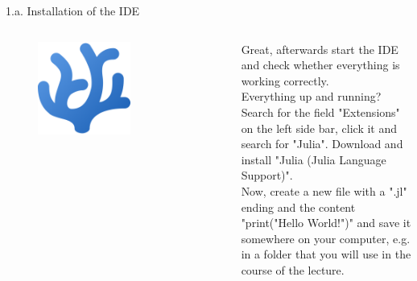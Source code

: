 \documentclass[aspectratio=1610,12pt]{beamer}
\begin{document}
\begin{frame}[fragile]{1.a. Installation of the IDE}
	\begin{columns}[onlytextwidth]
    	\center
    		\begin{figure}
    			\includegraphics[width=0.6\textwidth]{images/codium_cnl.png}
       		\end{figure}
    		Great, afterwards start the IDE and check whether everything is working correctly.\\
    		\vspace{0.2cm}
    		Everything up and running? Search for the field "Extensions" on the left side bar, click it and search for "Julia". Download and install "Julia (Julia Language Support)". \\
    		\vspace{0.2cm}
    		Now, create a new file with a ".jl" ending and the content "print("Hello World!")" and save it somewhere on your computer, e.g. in a folder that you will use in the course of the lecture.
    		\vspace{0.1cm}	
    \end{columns}
\end{frame}
\end{document}
